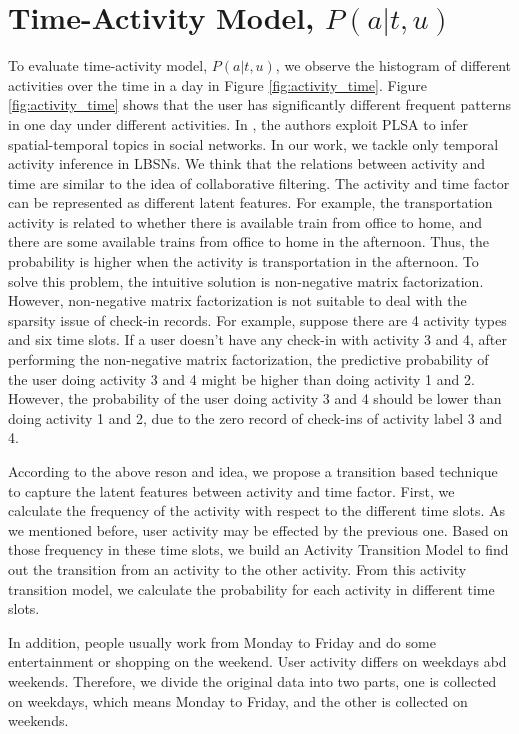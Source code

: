 \section{Time-Activity Model, $P(a | t, u)$}
\label{sec:4-4}
To evaluate time-activity model, $P(a | t, u)$, we observe the histogram of different activities over the time in a day in Figure \ref{fig:activity_time}. Figure \ref{fig:activity_time} shows that the user has significantly different  frequent patterns in one day under different activities. In \cite{06_WWW_Mei}, the authors exploit PLSA to infer spatial-temporal topics in social networks. In our work, we tackle only temporal activity inference in LBSNs. We think that the relations between activity and time are similar to the idea of collaborative filtering. The activity and time factor can be represented as different latent features. For example, the transportation activity is related to whether there is available train from office to home, and there are some available trains from office to home in the afternoon. Thus, the probability is higher when the activity is transportation in the afternoon. To solve this problem, the intuitive solution is non-negative matrix factorization. However, non-negative matrix factorization is not suitable to deal with the sparsity issue of check-in records. For example, suppose there are 4 activity types and six time slots. If a user doesn't have any check-in with activity 3 and 4, after performing the non-negative matrix factorization, the predictive probability of the user doing activity 3 and 4 might be higher than doing activity 1 and 2. However, the probability of the user doing activity 3 and 4 should be lower than doing activity 1 and 2, due to the zero record of check-ins of activity label 3 and 4.

According to the above reson and idea, we propose a transition based technique to capture the latent features between activity and time factor.
First, we calculate the frequency of the activity with respect to the different time slots. As we mentioned before, user activity may be effected by the previous one. Based on those frequency in these time slots, we build an Activity Transition Model to find out the transition from an activity to the other activity. From this activity transition model, we calculate the probability for each activity in different time slots.

    In addition, people usually work from Monday to Friday and do some entertainment or shopping on the weekend. User activity differs on weekdays abd weekends. Therefore, we divide the original data into two parts, one is collected on weekdays, which means Monday to Friday, and the other is collected on weekends. 
    




